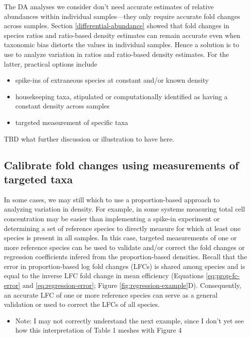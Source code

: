 \documentclass[
]{article}
\providecommand{\tightlist}{%
  \setlength{\itemsep}{0pt}\setlength{\parskip}{0pt}}
\theoremstyle{definition}
\theoremstyle{definition}
\theoremstyle{definition}
\theoremstyle{definition}
\theoremstyle{remark}
\begin{document}
The DA analyses we consider don't need accurate estimates of relative abundances within individual samples---they only require accurate fold changes across samples.
Section \ref{differential-abundance} showed that fold changes in species ratios and ratio-based density estimates can remain accurate even when taxonomic bias distorts the values in individual samples.
Hence a solution is to use to analyze variation in ratios and ratio-based density estimates.
For the latter, practical options include

\begin{itemize}
\tightlist
\item
  spike-ins of extraneous species at constant and/or known density
\item
  housekeeping taxa, stipulated or computationally identified as having a constant density across samples
\item
  targeted measurement of specific taxa
\end{itemize}

TBD what further discussion or illustration to have here.

\hypertarget{calibrate-fold-changes-using-measurements-of-targeted-taxa}{%
\subsection{Calibrate fold changes using measurements of targeted taxa}\label{calibrate-fold-changes-using-measurements-of-targeted-taxa}}

In some cases, we may still which to use a proportion-based approach to analyzing variation in density.
For example, in some systems measuring total cell concentration may be easier than implementing a spike-in experiment or determining a set of reference species to directly measure for which at least one species is present in all samples.
In this case, targeted measurements of one or more reference species can be used to validate and/or correct the fold changes or regression coefficients infered from the proportion-based densities.
Recall that the error in proportion-based log fold changes (LFCs) is shared among species and is equal to the inverse LFC fold change in mean efficiency (Equations \eqref{eq:prop-fc-error} and \eqref{eq:regression-error}; Figure \ref{fig:regression-example}D).
Consequently, an accurate LFC of one or more reference species can serve as a general validation or used to correct the LFCs of all species.

\begin{itemize}
\tightlist
\item
  Note: I may not correctly understand the next example, since I don't yet see how this interpretation of Table 1 meshes with Figure 4
\end{itemize}
\end{document}
